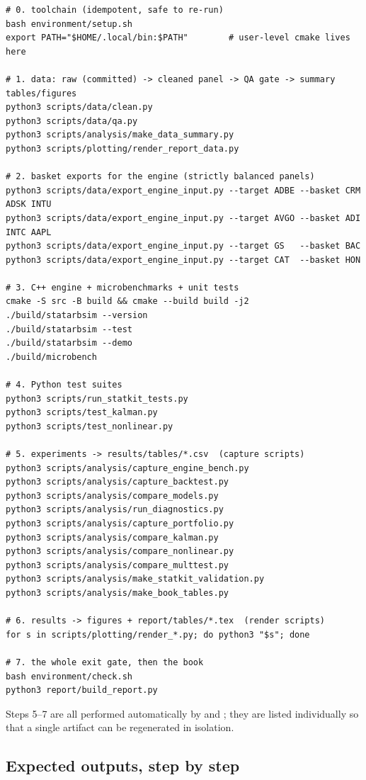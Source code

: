 \begin{verbatim}
# 0. toolchain (idempotent, safe to re-run)
bash environment/setup.sh
export PATH="$HOME/.local/bin:$PATH"        # user-level cmake lives here

# 1. data: raw (committed) -> cleaned panel -> QA gate -> summary tables/figures
python3 scripts/data/clean.py
python3 scripts/data/qa.py
python3 scripts/analysis/make_data_summary.py
python3 scripts/plotting/render_report_data.py

# 2. basket exports for the engine (strictly balanced panels)
python3 scripts/data/export_engine_input.py --target ADBE --basket CRM ADSK INTU
python3 scripts/data/export_engine_input.py --target AVGO --basket ADI INTC AAPL
python3 scripts/data/export_engine_input.py --target GS   --basket BAC
python3 scripts/data/export_engine_input.py --target CAT  --basket HON

# 3. C++ engine + microbenchmarks + unit tests
cmake -S src -B build && cmake --build build -j2
./build/statarbsim --version
./build/statarbsim --test
./build/statarbsim --demo
./build/microbench

# 4. Python test suites
python3 scripts/run_statkit_tests.py
python3 scripts/test_kalman.py
python3 scripts/test_nonlinear.py

# 5. experiments -> results/tables/*.csv  (capture scripts)
python3 scripts/analysis/capture_engine_bench.py
python3 scripts/analysis/capture_backtest.py
python3 scripts/analysis/compare_models.py
python3 scripts/analysis/run_diagnostics.py
python3 scripts/analysis/capture_portfolio.py
python3 scripts/analysis/compare_kalman.py
python3 scripts/analysis/compare_nonlinear.py
python3 scripts/analysis/compare_multtest.py
python3 scripts/analysis/make_statkit_validation.py
python3 scripts/analysis/make_book_tables.py

# 6. results -> figures + report/tables/*.tex  (render scripts)
for s in scripts/plotting/render_*.py; do python3 "$s"; done

# 7. the whole exit gate, then the book
bash environment/check.sh
python3 report/build_report.py
\end{verbatim}

Steps 5--7 are all performed automatically by  and
; they are listed individually so that a single artifact can be
regenerated in isolation.

\subsection{Expected outputs, step by step}

